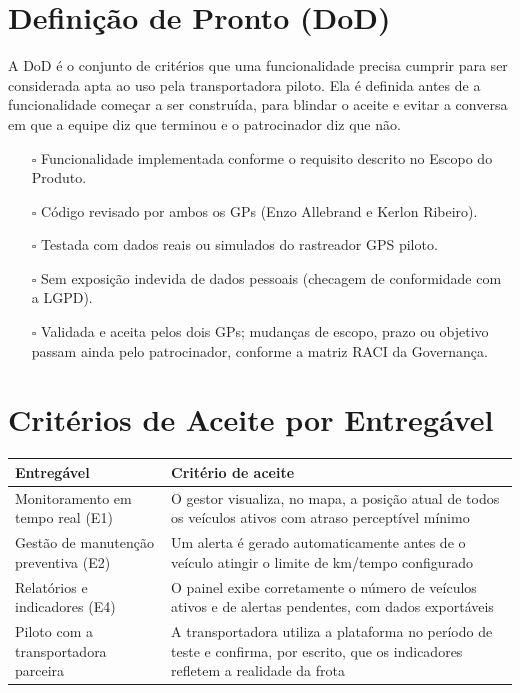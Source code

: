 \documentclass[11pt,a4paper]{article}
\newcommand{\dodbox}{$\square$}
\begin{document}
\section{Definição de Pronto (DoD)}
A DoD é o conjunto de critérios que uma funcionalidade precisa cumprir para ser considerada apta ao uso pela transportadora piloto. Ela é definida antes de a funcionalidade começar a ser construída, para blindar o aceite e evitar a conversa em que a equipe diz que terminou e o patrocinador diz que não.

\begin{itemize}[itemsep=3pt]
  \item[\dodbox] Funcionalidade implementada conforme o requisito descrito no Escopo do Produto.
  \item[\dodbox] Código revisado por ambos os GPs (Enzo Allebrand e Kerlon Ribeiro).
  \item[\dodbox] Testada com dados reais ou simulados do rastreador GPS piloto.
  \item[\dodbox] Sem exposição indevida de dados pessoais (checagem de conformidade com a LGPD).
  \item[\dodbox] Validada e aceita pelos dois GPs; mudanças de escopo, prazo ou objetivo passam ainda pelo patrocinador, conforme a matriz RACI da Governança.
\end{itemize}

\section{Critérios de Aceite por Entregável}
\begin{center}
\begin{tabularx}{\textwidth}{L L}
\toprule
\textbf{Entregável} & \textbf{Critério de aceite} \\
\midrule
Monitoramento em tempo real (E1) & O gestor visualiza, no mapa, a posição atual de todos os veículos ativos com atraso perceptível mínimo \\
Gestão de manutenção preventiva (E2) & Um alerta é gerado automaticamente antes de o veículo atingir o limite de km/tempo configurado \\
Relatórios e indicadores (E4) & O painel exibe corretamente o número de veículos ativos e de alertas pendentes, com dados exportáveis \\
Piloto com a transportadora parceira & A transportadora utiliza a plataforma no período de teste e confirma, por escrito, que os indicadores refletem a realidade da frota \\
\bottomrule
\end{tabularx}
\end{center}
\end{document}
